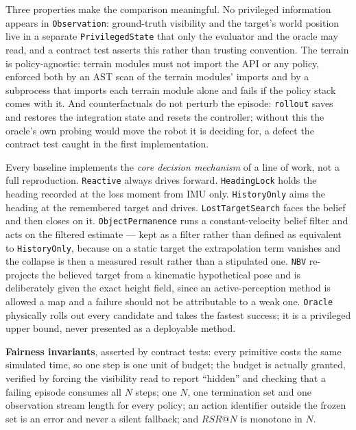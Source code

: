 \documentclass[utf8]{FrontiersinHarvard}
\begin{document}
Three properties make the comparison meaningful. No privileged information appears in
\texttt{Observation}: ground-truth visibility and the target's world position live in a
separate \texttt{PrivilegedState} that only the evaluator and the oracle may read, and a
contract test asserts this rather than trusting convention. The terrain is
policy-agnostic: terrain modules must not import the API or any policy, enforced both by
an AST scan of the terrain modules' imports and by a subprocess that imports each
terrain module alone and fails if the policy stack comes with it. And counterfactuals do
not perturb the episode: \texttt{rollout} saves and restores the integration state and
resets the controller; without this the oracle's own probing would move the robot it is
deciding for, a defect the contract test caught in the first implementation.

Every baseline implements the \emph{core decision mechanism} of a line of work, not a
full reproduction. \texttt{Reactive} always drives forward. \texttt{HeadingLock} holds
the heading recorded at the loss moment from IMU only. \texttt{HistoryOnly} aims the
heading at the remembered target and drives. \texttt{LostTargetSearch} faces the belief
and then closes on it. \texttt{ObjectPermanence} runs a constant-velocity belief filter
and acts on the filtered estimate --- kept as a filter rather than defined as equivalent
to \texttt{HistoryOnly}, because on a static target the extrapolation term vanishes and
the collapse is then a measured result rather than a stipulated one. \texttt{NBV}
re-projects the believed target from a kinematic hypothetical pose and is deliberately
given the exact height field, since an active-perception method is allowed a map and a
failure should not be attributable to a weak one. \texttt{Oracle} physically rolls out
every candidate and takes the fastest success; it is a privileged upper bound, never
presented as a deployable method.

\textbf{Fairness invariants}, asserted by contract tests: every primitive costs the same
simulated time, so one step is one unit of budget; the budget is actually granted,
verified by forcing the visibility read to report ``hidden'' and checking that a failing
episode consumes all $N$ steps; one $N$, one termination set and one observation stream
length for every policy; an action identifier outside the frozen set is an error and
never a silent fallback; and $RSR@N$ is monotone in $N$.
\end{document}
